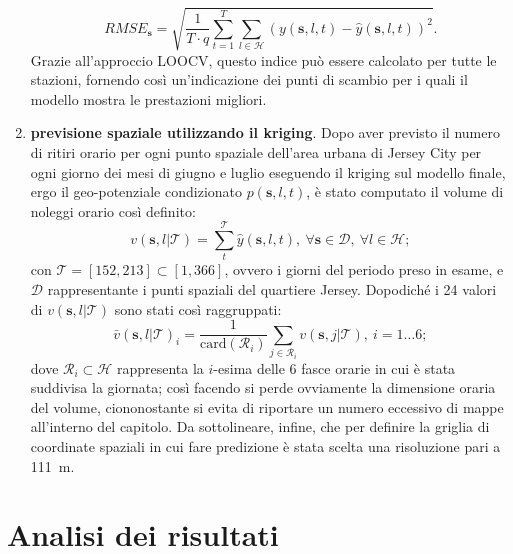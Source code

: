 \begin{enumerate}
	\begin{equation}
		RMSE_\mathbf{s} = \sqrt{\frac{1}{T\cdot q}\sum_{t=1}^{T}\sum_{l\in\mathcal{H}}^{} (y(\mathbf{s}, l, t) - \hat{y}(\mathbf{s}, l, t))^2}.
	\end{equation}
	Grazie all'approccio LOOCV, questo indice può essere calcolato per tutte le stazioni, fornendo così un'indicazione dei punti di scambio per i quali il modello mostra le prestazioni migliori. 
	\item \textbf{previsione spaziale utilizzando il kriging}. Dopo aver previsto il numero di ritiri orario per ogni punto spaziale dell'area urbana di Jersey City per ogni giorno dei mesi di giugno e luglio eseguendo il kriging sul modello finale, ergo il geo-potenziale condizionato $p(\mathbf{s}, l, t)$, è stato computato il volume di noleggi orario così definito:
	\begin{equation}
		v(\mathbf{s}, l|\mathcal{T}) = \sum_{t}^{\mathcal{T}} \hat{y}(\mathbf{s}, l, t), \ \forall \mathbf{s}\in\mathcal{D}, \ \forall l\in\mathcal{H};
		\label{equazioine_kriging_t}
	\end{equation}
	con $\mathcal{T} = [152, 213]\subset [1, 366]$, ovvero i giorni del periodo preso in esame, e $\mathcal{D}$ rappresentante i punti spaziali del quartiere Jersey. Dopodiché i \num{24} valori di $v(\mathbf{s}, l|\mathcal{T})$ sono stati così raggruppati:
	\begin{equation}
		\bar{v}(\mathbf{s}, l|\mathcal{T})_i = \frac{1}{\text{card}(\mathcal{R}_i)}\sum_{j\in\mathcal{R}_i}^{}v(\mathbf{s}, j|\mathcal{T}), \ i=1\dots 6;
	\end{equation}
	dove $\mathcal{R}_i\subset\mathcal{H}$ rappresenta la $i$-esima delle \num{6} fasce orarie in cui è stata suddivisa la giornata; così facendo si perde ovviamente la dimensione oraria del volume, ciononostante si evita di riportare un numero eccessivo di mappe all'interno del capitolo. Da sottolineare, infine, che per definire la griglia di coordinate spaziali in cui fare predizione è stata scelta una risoluzione pari a \num{111}~\unit{\meter}.
\end{enumerate}

\section{Analisi dei risultati}
